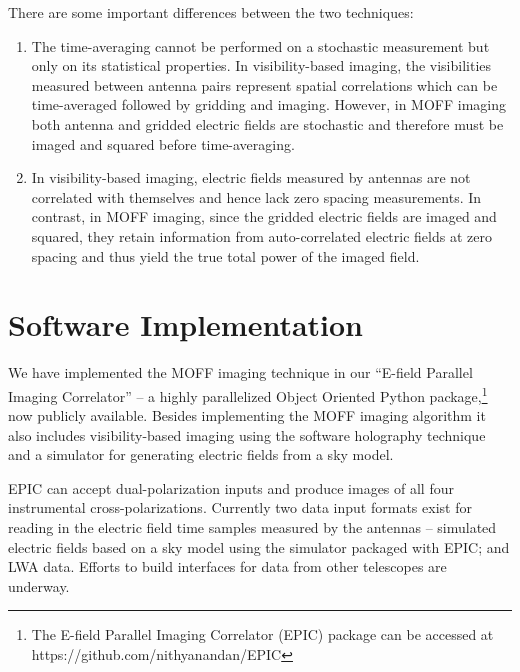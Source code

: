 \documentclass[a4paper,fleqn,usenatbib]{mnras}
\begin{document}
There are some important differences between the two techniques:
\begin{enumerate}
\item The time-averaging cannot be performed on a stochastic measurement but
  only on its statistical properties. In visibility-based imaging, the 
  visibilities measured between antenna pairs represent spatial correlations 
  which can be time-averaged followed by gridding and imaging. However, in MOFF 
  imaging both antenna and gridded electric fields are stochastic and therefore 
  must be imaged and squared before time-averaging. 
\item In visibility-based imaging, electric fields measured by antennas are not 
  correlated with themselves and hence lack zero spacing measurements. In 
  contrast, in MOFF imaging, since the gridded electric fields are imaged and 
  squared, they retain information from auto-correlated electric fields at zero 
  spacing and thus yield the true total power of the imaged field.
\end{enumerate} 

\section{Software Implementation}\label{sec:software}

We have implemented the MOFF imaging technique in our ``E-field Parallel Imaging
Correlator'' -- a highly parallelized Object Oriented Python 
package,\footnote{The E-field Parallel Imaging Correlator (EPIC) package can be 
accessed at https://github.com/nithyanandan/EPIC} now publicly available. Besides 
implementing the MOFF imaging algorithm it also includes visibility-based imaging 
using the software holography technique and a simulator for generating electric 
fields from a sky model. 


EPIC can accept dual-polarization inputs and produce images of all four 
instrumental cross-polarizations. Currently two data input formats exist for 
reading in the 
electric field time samples measured by the antennas -- simulated electric 
fields based on a sky model using the simulator packaged with EPIC; and LWA 
data. Efforts to build interfaces for data from other telescopes are underway.
\end{document}
